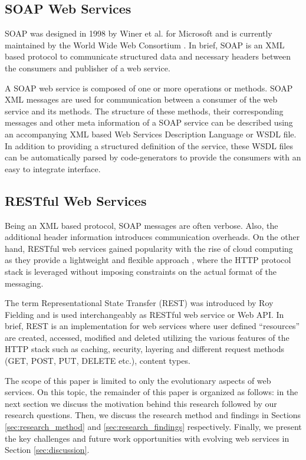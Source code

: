 \documentclass[runningheads,a4paper]{llncs}
\begin{document}
\subsection{SOAP Web Services} %
\label{sub:soap_web_services}
SOAP was designed in 1998 by Winer et al. for Microsoft and is currently maintained by the World Wide Web Consortium \cite{soap_wiki}. In brief, SOAP is an XML based protocol to communicate structured data and necessary headers between the consumers and publisher of a web service.

A SOAP web service is composed of one or more operations or methods. SOAP XML messages are used for communication between a consumer of the web service and its methods. The structure of these methods, their corresponding messages and other meta information of a SOAP service can be described using an accompanying XML based Web Services Description Language or WSDL file. In addition to providing a structured definition of the service, these WSDL files can be automatically parsed by code-generators to provide the consumers with an easy to integrate interface.


\subsection{RESTful Web Services} %
\label{sub:restful_web_services}
Being an XML based protocol, SOAP messages are often verbose. Also, the additional header information introduces communication overheads. On the other hand, RESTful web services gained popularity with the rise of cloud computing as they provide a lightweight and flexible approach \cite{mangler2010origin}, where the HTTP protocol stack is leveraged without imposing constraints on the actual format of the messaging.

The term Representational State Transfer (REST) was introduced by Roy Fielding \cite{rest_wiki} and is used interchangeably as RESTful web service or Web API. In brief, REST is an implementation for web services where user defined ``resources'' are created, accessed, modified and deleted utilizing the various features of the HTTP stack such as caching, security, layering and different request methods (GET, POST, PUT, DELETE etc.), content types.


The scope of this paper is limited to only the evolutionary aspects of web services. On this topic, the remainder of this paper is organized as follows: in the next section we discuss the motivation behind this research followed by our research questions. Then, we discuss the research method and findings in Sections \ref{sec:research_method} and \ref{sec:research_findings} respectively. Finally, we present the key challenges and future work opportunities with evolving web services in Section \ref{sec:discussion}.
\end{document}
